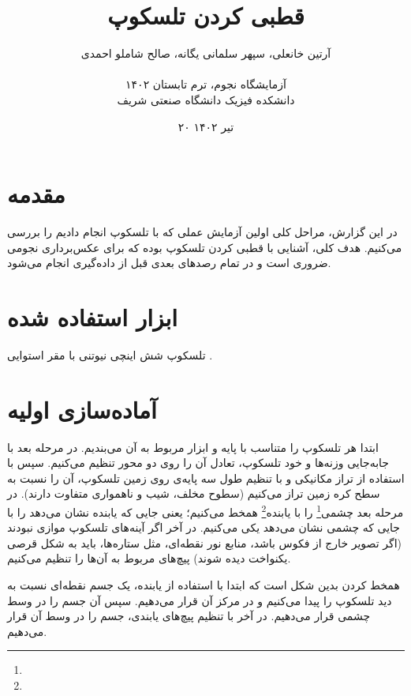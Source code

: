\documentclass[12pt,a4paper]{article}
\title{قطبی کردن تلسکوپ}
\author{آرتین خانعلی، سپهر سلمانی یگانه، صالح شاملو احمدی\\\\
	آزمایشگاه نجوم، ترم تابستان ۱۴۰۲\\دانشکده فیزیک دانشگاه صنعتی شریف}
\date{۲۰ تیر ۱۴۰۲}
\begin{document}
	\maketitle
	\twocolumnfootnotes
	\section{مقدمه}
	در این گزارش، مراحل کلی اولین آزمایش عملی که با تلسکوپ انجام دادیم را بررسی می‌کنیم. هدف کلی، آشنایی با
	قطبی کردن تلسکوپ بوده که برای عکس‌برداری نجومی ضروری است و در تمام رصدهای بعدی قبل از داده‌گیری انجام می‌شود.
	\section{ابزار استفاده شده}
	تلسکوپ شش اینچی نیوتنی  با مقر استوایی .
	\section{آماده‌سازی اولیه}
	ابتدا هر تلسکوپ را متناسب با پایه و ابزار مربوط به آن می‌بندیم. در مرحله بعد با جابه‌جایی وزنه‌ها و خود تلسکوپ،
	تعادل آن را روی دو محور تنظیم می‌کنیم. سپس با استفاده از تراز مکانیکی و با تنظیم طول سه پایه‌ی روی زمین تلسکوپ،
	آن را نسبت به سطح کره زمین تراز می‌کنیم (سطوح مخلف، شیب و ناهمواری متفاوت دارند). در مرحله بعد
	چشمی\footnote{} را با یابنده\footnote{} همخط می‌کنیم؛ یعنی جایی که یابنده نشان می‌دهد را با
	جایی که چشمی نشان می‌دهد یکی می‌کنیم. در آخر اگر آینه‌های تلسکوپ موازی نبودند (اگر تصویر خارج از فکوس باشد، منابع
	نور نقطه‌ای، مثل ستاره‌ها، باید به شکل قرصی یکنواخت دیده شوند) پیچ‌های مربوط به آن‌ها را تنظیم می‌کنیم.
	
	همخط کردن بدین شکل است که ابتدا با استفاده از یابنده، یک جسم نقطه‌ای نسبت به دید تلسکوپ را پیدا می‌کنیم و در مرکز آن
	قرار می‌دهیم. سپس آن جسم را در وسط چشمی قرار می‌دهیم. در آخر با تنظیم پیچ‌های یابندی، جسم را در وسط آن قرار می‌دهیم.
\end{document}
